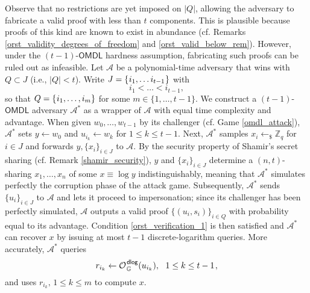 \documentclass{iacrtrans}
\begin{document}
Observe that no restrictions are yet imposed on $|Q|$,
allowing the adversary to fabricate
a valid proof with less than $t$ components.
This is plausible because proofs of this kind
are known to exist in abundance
(cf. Remarks \ref{orst_validity_degrees_of_freedom}
and \ref{orst_valid_below_rem}).
However, under the $(t-1)$-$\mathsf{OMDL}$ hardness assumption,
fabricating such proofs can be ruled out as infeasible.
Let $\mathcal{A}$ be a polynomial-time adversary
that wins with $Q \subset J$ (i.e., $|Q| < t$).
Write $J = \{\hspace{0.5pt}i_1, \dots i_{t-1}\hspace{0.5pt}\}$
with
\begin{equation*}
i_1 < \dots < i_{t-1},
\end{equation*}
so that
$Q = \{\hspace{0.5pt}i_1, \dots, i_m\}$
for some $m \in \{1, \dots, t-1\}$.
We construct a $(t-1)$-$\mathsf{OMDL}$ adversary
$\mathcal{A}^*$ as a wrapper of $\mathcal{A}$
with equal time complexity and advantage.
When given $w_0, \dots, w_{t-1}$ by its challenger
(cf. Game \ref{omdl_attack}),
$\mathcal{A}^*$ sets $y \leftarrow w_0$ and
$u_{i_k} \leftarrow w_k$ for $1 \le k \le t-1$.
Next, $\mathcal{A}^*$ samples
$x_i \leftarrow_\$ \mathbb{Z}_q$ for $i \in J$
and forwards $y, \{x_i\}_{i \in J}$ to $\mathcal{A}$.
By the security property of Shamir's secret sharing
(cf. Remark \ref{shamir_security}),
$y$ and $\{x_i\}_{i \in J}$
determine a $(n, t)$-sharing $x_1, \dots, x_n$
of some $x \equiv \log y$
indistinguishably, meaning that $\mathcal{A}^*$
simulates perfectly the corruption phase of the attack game.
Subsequently, $\mathcal{A}^*$ sends $\{u_i\}_{i \in J}$ to $\mathcal{A}$
and lets it proceed to impersonation;
since its challenger has been perfectly simulated,
$\mathcal{A}$ outputs a valid proof $\{(u_i, s_i)\}_{i \in Q}$
with probability equal to its advantage.
Condition \eqref{orst_verification_1}
is then satisfied and $\mathcal{A}^*$ can recover $x$ by issuing
at most $t-1$ discrete-logarithm queries.
More accurately, $\mathcal{A}^*$ queries
\vspace{5pt}
\begin{equation*}
r_{i_k} \leftarrow \mathcal{O}
	_{\hspace{1pt}\mathbb{G}}
	^{\hspace{1pt}\mathsf{dlog}}(u_{i_k}),
\ \ 1 \le k \le t-1
\hspace{1pt},
\vspace{5pt}
\end{equation*}
and uses $r_{i_k},\hspace{2pt} 1 \le k \le m$ to compute $x$.
\end{document}
